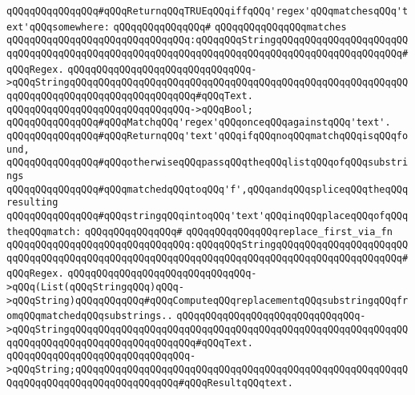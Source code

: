 \newline
\newline
\verb|qQQqqQQqqQQqqQQq#qQQqReturnqQQqTRUEqQQqiffqQQq'regex'qQQqmatchesqQQq'text'qQQqsomewhere:|\newline
\verb|qQQqqQQqqQQqqQQq#|\newline
\verb|qQQqqQQqqQQqqQQqmatches|\newline
\verb|qQQqqQQqqQQqqQQqqQQqqQQqqQQqqQQq:qQQqqQQqStringqQQqqQQqqQQqqQQqqQQqqQQqqQQqqQQqqQQqqQQqqQQqqQQqqQQqqQQqqQQqqQQqqQQqqQQqqQQqqQQqqQQqqQQqqQQq#qQQqRegex.|\newline
\verb|qQQqqQQqqQQqqQQqqQQqqQQqqQQqqQQq->qQQqStringqQQqqQQqqQQqqQQqqQQqqQQqqQQqqQQqqQQqqQQqqQQqqQQqqQQqqQQqqQQqqQQqqQQqqQQqqQQqqQQqqQQqqQQqqQQq#qQQqText.|\newline
\verb|qQQqqQQqqQQqqQQqqQQqqQQqqQQqqQQq->qQQqBool;|\newline
\newline
\verb|qQQqqQQqqQQqqQQq#qQQqMatchqQQq'regex'qQQqonceqQQqagainstqQQq'text'.|\newline
\verb|qQQqqQQqqQQqqQQq#qQQqReturnqQQq'text'qQQqifqQQqnoqQQqmatchqQQqisqQQqfound,|\newline
\verb|qQQqqQQqqQQqqQQq#qQQqotherwiseqQQqpassqQQqtheqQQqlistqQQqofqQQqsubstrings|\newline
\verb|qQQqqQQqqQQqqQQq#qQQqmatchedqQQqtoqQQq'f',qQQqandqQQqspliceqQQqtheqQQqresulting|\newline
\verb|qQQqqQQqqQQqqQQq#qQQqstringqQQqintoqQQq'text'qQQqinqQQqplaceqQQqofqQQqtheqQQqmatch:|\newline
\verb|qQQqqQQqqQQqqQQq#|\newline
\verb|qQQqqQQqqQQqqQQqreplace_first_via_fn|\newline
\verb|qQQqqQQqqQQqqQQqqQQqqQQqqQQqqQQq:qQQqqQQqStringqQQqqQQqqQQqqQQqqQQqqQQqqQQqqQQqqQQqqQQqqQQqqQQqqQQqqQQqqQQqqQQqqQQqqQQqqQQqqQQqqQQqqQQqqQQq#qQQqRegex.|\newline
\verb|qQQqqQQqqQQqqQQqqQQqqQQqqQQqqQQq->qQQq(List(qQQqStringqQQq)qQQq->qQQqString)qQQqqQQqqQQq#qQQqComputeqQQqreplacementqQQqsubstringqQQqfromqQQqmatchedqQQqsubstrings..|\newline
\verb|qQQqqQQqqQQqqQQqqQQqqQQqqQQqqQQq->qQQqStringqQQqqQQqqQQqqQQqqQQqqQQqqQQqqQQqqQQqqQQqqQQqqQQqqQQqqQQqqQQqqQQqqQQqqQQqqQQqqQQqqQQqqQQqqQQq#qQQqText.|\newline
\verb|qQQqqQQqqQQqqQQqqQQqqQQqqQQqqQQq->qQQqString;qQQqqQQqqQQqqQQqqQQqqQQqqQQqqQQqqQQqqQQqqQQqqQQqqQQqqQQqqQQqqQQqqQQqqQQqqQQqqQQqqQQqqQQq#qQQqResultqQQqtext.|\newline
